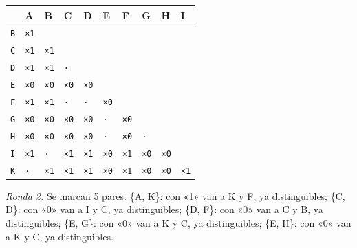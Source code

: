 \documentclass[11pt]{article}
\begin{document}
\begin{center}\footnotesize\begin{tabular}{llllllllll}\toprule
 & A & B & C & D & E & F & G & H & I \\\midrule
\texttt{B} & \texttt{×1} & \texttt{} & \texttt{} & \texttt{} & \texttt{} & \texttt{} & \texttt{} & \texttt{} & \texttt{} \\
\texttt{C} & \texttt{×1} & \texttt{×1} & \texttt{} & \texttt{} & \texttt{} & \texttt{} & \texttt{} & \texttt{} & \texttt{} \\
\texttt{D} & \texttt{×1} & \texttt{×1} & \texttt{·} & \texttt{} & \texttt{} & \texttt{} & \texttt{} & \texttt{} & \texttt{} \\
\texttt{E} & \texttt{×0} & \texttt{×0} & \texttt{×0} & \texttt{×0} & \texttt{} & \texttt{} & \texttt{} & \texttt{} & \texttt{} \\
\texttt{F} & \texttt{×1} & \texttt{×1} & \texttt{·} & \texttt{·} & \texttt{×0} & \texttt{} & \texttt{} & \texttt{} & \texttt{} \\
\texttt{G} & \texttt{×0} & \texttt{×0} & \texttt{×0} & \texttt{×0} & \texttt{·} & \texttt{×0} & \texttt{} & \texttt{} & \texttt{} \\
\texttt{H} & \texttt{×0} & \texttt{×0} & \texttt{×0} & \texttt{×0} & \texttt{·} & \texttt{×0} & \texttt{·} & \texttt{} & \texttt{} \\
\texttt{I} & \texttt{×1} & \texttt{·} & \texttt{×1} & \texttt{×1} & \texttt{×0} & \texttt{×1} & \texttt{×0} & \texttt{×0} & \texttt{} \\
\texttt{K} & \texttt{·} & \texttt{×1} & \texttt{×1} & \texttt{×1} & \texttt{×0} & \texttt{×1} & \texttt{×0} & \texttt{×0} & \texttt{×1} \\
\bottomrule\end{tabular}\end{center}
\textit{Ronda 2.} Se marcan 5 pares. \{A, K\}: con «1» van a K y F, ya distinguibles; \{C, D\}: con «0» van a I y C, ya distinguibles; \{D, F\}: con «0» van a C y B, ya distinguibles; \{E, G\}: con «0» van a K y C, ya distinguibles; \{E, H\}: con «0» van a K y C, ya distinguibles.
\end{document}
